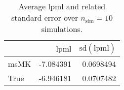 \begin{table}[H]

\caption{Average lpml and related standard error over $n_{\text{sim}} = 10$ simulations.}
\centering
\begin{tabular}[t]{lrr}
\toprule
  & $\overbar{\text{lpml}}$ & $\text{sd}(\overbar{\text{lpml}})$\\
\midrule
msMK & -7.084391 & 0.0698494\\
True & -6.946181 & 0.0707482\\
\bottomrule
\end{tabular}
\end{table}
